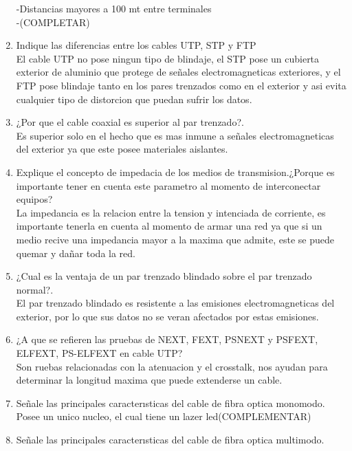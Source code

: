 \documentclass{udparticle}
\begin{document}
\begin{enumerate}
    -Distancias mayores a 100 mt entre terminales\\
    -(COMPLETAR)\\
    \item Indique las diferencias entre los cables UTP, STP y FTP\\
    El cable UTP no pose ningun tipo de blindaje, el STP pose un cubierta exterior de aluminio que protege de señales electromagneticas exteriores, y el FTP pose blindaje tanto en los pares trenzados como en el exterior y asi evita cualquier tipo de distorcion que puedan sufrir los datos.\\
    \item  ¿Por que el cable coaxial es superior al par trenzado?.\\
    Es superior solo en el hecho que es mas inmune a señales electromagneticas del exterior ya que este posee materiales aislantes.\\
    \item Explique el concepto de impedacia de los medios de transmision.¿Porque es importante tener en cuenta este parametro al momento de interconectar equipos? \\
    La impedancia es la relacion entre la tension y intenciada de corriente, es importante tenerla en cuenta al momento de armar una red ya que si un medio recive una impedancia mayor a la maxima que admite, este se puede quemar y dañar toda la red.\\
    \item ¿Cual es la ventaja de un par trenzado blindado sobre el par trenzado normal?.\\
    El par trenzado blindado es resistente a las emisiones electromagneticas del exterior, por lo que sus datos no se veran afectados por estas emisiones.\\
    \item ¿A que se reﬁeren las pruebas de NEXT, FEXT, PSNEXT y PSFEXT, ELFEXT, PS-ELFEXT en cable UTP?\\
    Son ruebas relacionadas con la atenuacion y el crosstalk, nos ayudan para determinar la longitud maxima que puede extenderse un cable.\\
  \item Señale las principales caracterısticas del cable de ﬁbra optica monomodo.\\
  Posee un unico nucleo, el cual tiene un lazer led(COMPLEMENTAR)\\
  \item Señale las principales caracterısticas del cable de ﬁbra optica multimodo. \\

\end{enumerate}
\end{document}
